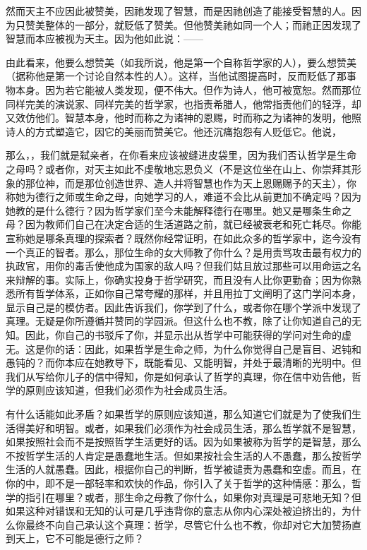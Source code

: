 然而天主不应因此被赞美，因祂发现了智慧，而是因祂创造了能接受智慧的人。因为只赞美整体的一部分，就贬低了赞美。但他赞美祂如同一个人；而祂正因发现了智慧而本应被视为天主。因为他如此说：——\par

\par

由此看来，他要么想赞美（如我所说，他是第一个自称哲学家的人），要么想赞美（据称他是第一个讨论自然本性的人）。这样，当他试图提高时，反而贬低了那事物本身。因为若它能被人类发现，便不伟大。但作为诗人，他可被宽恕。然而那位同样完美的演说家、同样完美的哲学家，也指责希腊人，他常指责他们的轻浮，却又效仿他们。智慧本身，他时而称之为诸神的恩赐，时而称之为诸神的发明，他照诗人的方式塑造它，因它的美丽而赞美它。他还沉痛抱怨有人贬低它。他说，\par

那么，，我们就是弑亲者，在你看来应该被缝进皮袋里，因为我们否认哲学是生命之母吗？或者你，对天主如此不虔敬地忘恩负义（不是这位坐在山上、你崇拜其形象的那位神，而是那位创造世界、造人并将智慧也作为天上恩赐赐予的天主），你称她为德行之师或生命之母，向她学习的人，难道不会比从前更加不确定吗？因为她教的是什么德行？因为哲学家们至今未能解释德行在哪里。她又是哪条生命之母？因为教师们自己在决定合适的生活道路之前，就已经被衰老和死亡耗尽。你能宣称她是哪条真理的探索者？既然你经常证明，在如此众多的哲学家中，迄今没有一个真正的智者。那么，那位生命的女大师教了你什么？是用责骂攻击最有权力的执政官，用你的毒舌使他成为国家的敌人吗？但我们姑且放过那些可以用命运之名来辩解的事。实际上，你确实投身于哲学研究，而且没有人比你更勤奋；因为你熟悉所有哲学体系，正如你自己常夸耀的那样，并且用拉丁文阐明了这门学问本身，显示自己是的模仿者。因此告诉我们，你学到了什么，或者你在哪个学派中发现了真理。无疑是你所遵循并赞同的学园派。但这什么也不教，除了让你知道自己的无知。因此，你自己的书驳斥了你，并显示出从哲学中可能获得的学问对生命的虚无。这是你的话：因此，如果哲学是生命之师，为什么你觉得自己是盲目、迟钝和愚钝的？而你本应在她教导下，既能看见、又能明智，并处于最清晰的光明中。但我们从写给你儿子的信中得知，你是如何承认了哲学的真理，你在信中劝告他，哲学的原则应该知道，但我们必须作为社会成员生活。\par

有什么话能如此矛盾？如果哲学的原则应该知道，那么知道它们就是为了使我们生活得美好和明智。或者，如果我们必须作为社会成员生活，那么哲学就不是智慧，如果按照社会而不是按照哲学生活更好的话。因为如果被称为哲学的是智慧，那么不按哲学生活的人肯定是愚蠢地生活。但如果按社会生活的人不愚蠢，那么按哲学生活的人就愚蠢。因此，根据你自己的判断，哲学被谴责为愚蠢和空虚。而且，在你的中，即不是一部轻率和欢快的作品，你引入了关于哲学的这种情感：那么，哲学的指引在哪里？或者，那生命之母教了你什么，如果你对真理是可悲地无知？但如果这种对错误和无知的认可是几乎违背你的意志从你内心深处被迫挤出的，为什么你最终不向自己承认这个真理：哲学，尽管它什么也不教，你却对它大加赞扬直到天上，它不可能是德行之师？\par

